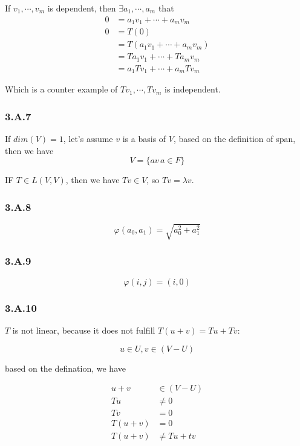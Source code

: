 If $v_{1}, \cdots , v_{m}$ is dependent, then $ \exists a_{1}, \cdots, a_{m} $ that 
\begin{equation*}
    \begin{split}
0 &= a_{1}v_{1} + \cdots + a_{m}v_{m} \\
0 &= T(0) \\
 &= T(a_{1}v_{1} + \cdots + a_{m}v_{m}) \\
    & = Ta_{1}v_{1} + \cdots + Ta_{m}v_{m} \\
    & = a_{1}Tv_{1} + \cdots + a_{m}Tv_{m}
\end{split}
\end{equation*}

Which is a counter example of $Tv_{1}, \cdots, Tv_{m}$ is independent.

\subsubsection*{3.A.7}

If $dim(V) = 1$, let's assume $v$ is a basis of $V$, based on the definition of span, then we have 
\[V=\{av\, a\in F\}\]

IF $T\in L(V,V)$, then we have $Tv\in V$, so $Tv = \lambda v$.

\subsubsection*{3.A.8}

\[\varphi(a_{0}, a_{1}) = \sqrt{a_{0}^{2} + a_{1}^{2}}\]

\subsubsection*{3.A.9}
\[\varphi(i, j) = (i, 0)\]

\subsubsection*{3.A.10}

$T$ is not linear, because it does not fulfill $T(u+v) = Tu + Tv$:

\[u\in U, v \in (V - U)\] 

based on the defination, we have 

\begin{equation*}
    \begin{split}
u+v &\in (V-U) \\
Tu &\neq 0  \\
Tv &= 0 \\
T(u+v) &= 0 \\
T(u+v) &\neq Tu + tv
\end{split}
\end{equation*}

